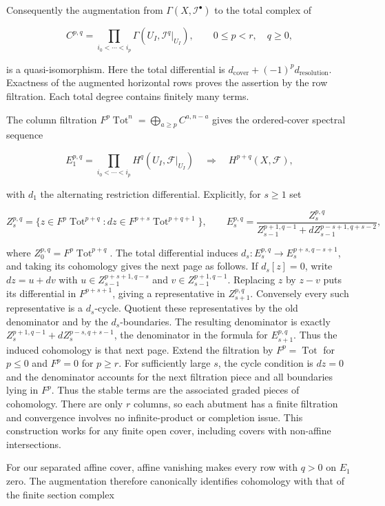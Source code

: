 \documentclass[11pt,a4paper,openany]{report}
\begin{document}
Consequently the augmentation from \(\Gamma(X,\mathcal I^\bullet)\) to the total complex of

\[
C^{p,q}=\prod_{i_0<\cdots<i_p}\Gamma(U_I,\mathcal I^q|_{U_I}),
\qquad 0\leq p<r,\quad q\geq0,
\]

is a quasi-isomorphism. Here the total differential is \(d_{\mathrm{cover}}+(-1)^p d_{\mathrm{resolution}}\). Exactness of the augmented horizontal rows proves the assertion by the row filtration. Each total degree contains finitely many terms.

The column filtration \(F^p\operatorname{Tot}^n=\bigoplus_{a\geq p}C^{a,n-a}\) gives the ordered-cover spectral sequence

\[
E_1^{p,q}=\prod_{i_0<\cdots<i_p}H^q(U_I,\mathcal F|_{U_I})
\quad\Longrightarrow\quad H^{p+q}(X,\mathcal F),
\]

with \(d_1\) the alternating restriction differential. Explicitly, for \(s\geq1\) set

\[
Z_s^{p,q}=\{z\in F^p\operatorname{Tot}^{p+q}:dz\in F^{p+s}\operatorname{Tot}^{p+q+1}\},
\qquad
E_s^{p,q}=\frac{Z_s^{p,q}}
{Z_{s-1}^{p+1,q-1}+dZ_{s-1}^{p-s+1,q+s-2}},
\]

where \(Z_0^{p,q}=F^p\operatorname{Tot}^{p+q}\). The total differential induces \(d_s:E_s^{p,q}\to E_s^{p+s,q-s+1}\), and taking its cohomology gives the next page as follows. If \(d_s[z]=0\), write \(dz=u+dv\) with \(u\in Z_{s-1}^{p+s+1,q-s}\) and \(v\in Z_{s-1}^{p+1,q-1}\). Replacing \(z\) by \(z-v\) puts its differential in \(F^{p+s+1}\), giving a representative in \(Z_{s+1}^{p,q}\). Conversely every such representative is a \(d_s\)-cycle. Quotient these representatives by the old denominator and by the \(d_s\)-boundaries. The resulting denominator is exactly \(Z_s^{p+1,q-1}+dZ_s^{p-s,q+s-1}\), the denominator in the formula for \(E_{s+1}^{p,q}\). Thus the induced cohomology is that next page. Extend the filtration by \(F^p=\operatorname{Tot}\) for \(p\leq0\) and \(F^p=0\) for \(p\geq r\). For sufficiently large \(s\), the cycle condition is \(dz=0\) and the denominator accounts for the next filtration piece and all boundaries lying in \(F^p\). Thus the stable terms are the associated graded pieces of cohomology. There are only \(r\) columns, so each abutment has a finite filtration and convergence involves no infinite-product or completion issue. This construction works for any finite open cover, including covers with non-affine intersections.

For our separated affine cover, affine vanishing makes every row with \(q>0\) on \(E_1\) zero. The augmentation therefore canonically identifies cohomology with that of the finite section complex
\end{document}
